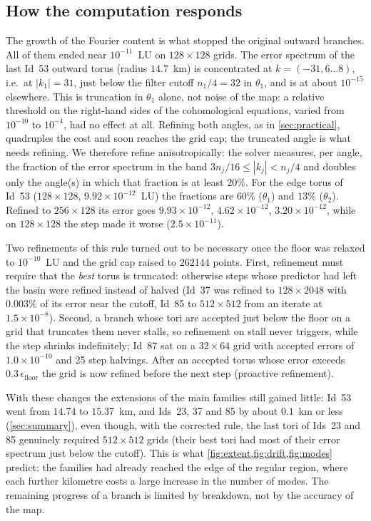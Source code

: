 \documentclass[11pt]{article}
\begin{document}
\subsection{How the computation responds}\label{sec:limits-response}
The growth of the Fourier content is what stopped the original outward branches. All of them ended
near $10^{-11}$~LU on $128\times128$ grids. The error spectrum of the last Id~53 outward torus
(radius $14.7$~km) is concentrated at $k=(-31,6\ldots8)$, i.e.\ at $|k_1| = 31$, just below the
filter cutoff $n_1/4 = 32$ in $\theta_1$, and is at about $10^{-15}$ elsewhere. This is truncation in
$\theta_1$ alone, not noise of the map: a relative threshold on the right-hand sides of the
cohomological equations, varied from $10^{-10}$ to $10^{-4}$, had no effect at all. Refining both
angles, as in \cref{sec:practical}, quadruples the cost and soon reaches the grid cap; the
truncated angle is what needs refining. We therefore refine anisotropically: the solver measures,
per angle, the fraction of the error spectrum in the band $3n_j/16\le|k_j|<n_j/4$ and doubles only
the angle(s) in which that fraction is at least $20\%$. For the edge torus of Id~53 ($128\times128$,
$9.92\times10^{-12}$~LU) the fractions are $60\%$ ($\theta_1$) and $13\%$ ($\theta_2$). Refined to
$256\times128$ its error goes $9.93\times10^{-12}$, $4.62\times10^{-12}$, $3.20\times10^{-12}$, while
on $128\times128$ the step made it worse ($2.5\times10^{-11}$).

Two refinements of this rule turned out to be necessary once the floor was relaxed to
$10^{-10}$~LU and the grid cap raised to $262144$ points. First, refinement must require that the
\emph{best} torus is truncated: otherwise steps whose predictor had left the basin were refined
instead of halved (Id~37 was refined to $128\times2048$ with $0.003\%$ of its error near the cutoff,
Id~85 to $512\times512$ from an iterate at $1.5\times10^{-8}$). Second, a branch whose tori are
accepted just below the floor on a grid that truncates them never stalls, so refinement on stall
never triggers, while the step shrinks indefinitely; Id~87 sat on a $32\times64$ grid with accepted
errors of $1.0\times10^{-10}$ and 25 step halvings. After an accepted torus whose error exceeds
$0.3\,\epsilon_{\mathrm{floor}}$ the grid is now refined before the next step (proactive refinement).

With these changes the extensions of the main families still gained little: Id~53 went from
$14.74$ to $15.37$~km, and Ids~23, 37 and 85 by about $0.1$~km or less (\cref{sec:summary}), even
though, with the corrected rule, the last tori of Ids~23 and 85 genuinely required $512\times512$
grids (their best tori had most of their error spectrum just below the cutoff). This is
what \cref{fig:extent,fig:drift,fig:modes} predict: the families had already reached the edge of the
regular region, where each further kilometre costs a large increase in the number of modes. The
remaining progress of a branch is limited by breakdown, not by the accuracy of the map.
\end{document}
